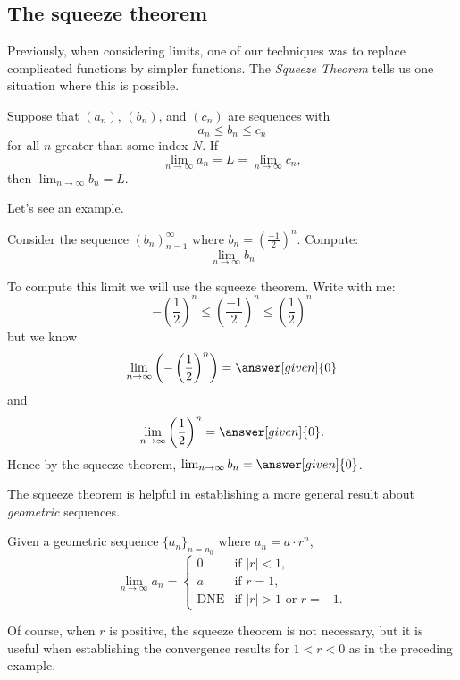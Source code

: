 \documentclass{ximera}
\begin{document}
\subsection{The squeeze theorem}

%

Previously, when considering limits, one of our techniques was to replace 
complicated functions by simpler functions. The \textit{Squeeze Theorem}
tells us one situation where this is possible.

\begin{theorem}
  Suppose that $(a_n)$, $(b_n)$, and $(c_n)$ are sequences with
  \[
  a_n \le b_n \le c_n
  \]
  for all $n$ greater than some index $N$. If
  \[
  \lim_{n\to\infty} a_n = L = \lim_{n\to\infty} c_n,
  \] 
  then $\lim_{n\to\infty} b_n = L$.
\end{theorem}

Let's see an example.

\begin{example}
  Consider the sequence $(b_n)_{n=1}^{\infty}$ where $b_n =
  \left(\frac{-1}{2}\right)^n$. Compute:
  \[
  \lim_{n\to\infty}b_n
  \]
  \begin{explanation}
    To compute this limit we will use the squeeze theorem. Write with
    me:
    \[
    -\left(\frac{1}{2}\right)^n\le \left(\frac{-1}{2}\right)^n \le \left(\frac{1}{2}\right)^n
    \]
    but we know
    \[
    \lim_{n\to \infty}\left(-\left(\frac{1}{2}\right)^n\right) = \answer[given]{0}
    \]
    and
    \[
    \lim_{n\to \infty}\left(\frac{1}{2}\right)^n =\answer[given]{0}.
    \]
    Hence by the squeeze theorem, $\lim_{n\to\infty} b_n = \answer[given]{0}$.
  \end{explanation}
\end{example}

%

The squeeze theorem is helpful in establishing a more general result about \emph{geometric} sequences.
\begin{theorem}
  Given a geometric sequence $\{a_n\}_{n=n_0}$ where $a_n = a \cdot r^{n}$,
  \[
  \lim_{n\to\infty} a_n =
  \begin{cases}
    0 &\text{if $|r|<1$,}\\
    a &\text{if $r=1$,}\\
    \text{DNE} &\text{if $|r|>1$ or $r=-1$.}
  \end{cases}
  \]
\end{theorem}
Of course, when $r$ is positive, the squeeze theorem is not necessary, but it is useful when establishing the convergence results for $1<r<0$ as in the preceding example.
\end{document}
